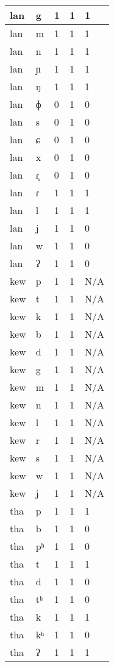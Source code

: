 \begin{longtable}{ | l | l | l | l | l | }
	lan & g & 1 & 1 & 1 \\ \hline
	lan & m & 1 & 1 & 1 \\ \hline
	lan & n & 1 & 1 & 1 \\ \hline
	lan & ɲ & 1 & 1 & 1 \\ \hline
	lan & ŋ & 1 & 1 & 1 \\ \hline
	lan & ɸ & 0 & 1 & 0 \\ \hline
	lan & s & 0 & 1 & 0 \\ \hline
	lan & ɕ & 0 & 1 & 0 \\ \hline
	lan & x & 0 & 1 & 0 \\ \hline
	lan & ɾ̥ & 0 & 1 & 0 \\ \hline
	lan & ɾ & 1 & 1 & 1 \\ \hline
	lan & l & 1 & 1 & 1 \\ \hline
	lan & j & 1 & 1 & 0 \\ \hline
	lan & w & 1 & 1 & 0 \\ \hline
	lan & ʔ & 1 & 1 & 0 \\ \hline
	kew & p & 1 & 1 & N/A \\ \hline
	kew & t & 1 & 1 & N/A \\ \hline
	kew & k & 1 & 1 & N/A \\ \hline
	kew & b & 1 & 1 & N/A \\ \hline
	kew & d & 1 & 1 & N/A \\ \hline
	kew & g & 1 & 1 & N/A \\ \hline
	kew & m & 1 & 1 & N/A \\ \hline
	kew & n & 1 & 1 & N/A \\ \hline
	kew & l & 1 & 1 & N/A \\ \hline
	kew & r & 1 & 1 & N/A \\ \hline
	kew & s & 1 & 1 & N/A \\ \hline
	kew & w & 1 & 1 & N/A \\ \hline
	kew & j & 1 & 1 & N/A \\ \hline
	tha & p & 1 & 1 & 1 \\ \hline
	tha & b & 1 & 1 & 0 \\ \hline
	tha & pʰ & 1 & 1 & 0 \\ \hline
	tha & t & 1 & 1 & 1 \\ \hline
	tha & d & 1 & 1 & 0 \\ \hline
	tha & tʰ & 1 & 1 & 0 \\ \hline
	tha & k & 1 & 1 & 1 \\ \hline
	tha & kʰ & 1 & 1 & 0 \\ \hline
	tha & ʔ & 1 & 1 & 1 \\ \hline

\end{longtable}

